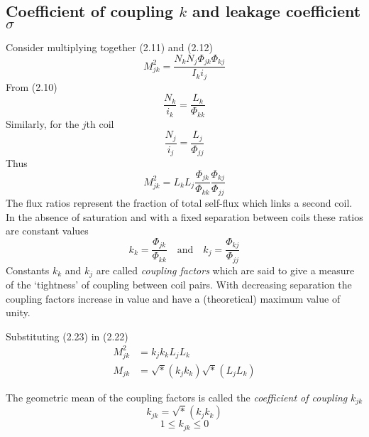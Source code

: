 \documentclass[a4paper,numbers=noenddot,12pt]{scrbook}
\begin{document}
        \subsection{Coefficient of coupling $k$ and leakage coefficient $\sigma$} Consider multiplying together (2.11) and (2.12)
        \begin{equation*}
            M_{jk}^2 = \dfrac{N_k N_j \Phi_{jk} \Phi_{kj}}{I_k i_j}
        \end{equation*}
        From (2.10)
        \begin{equation*}
            \dfrac{N_k}{i_k} = \dfrac{L_k}{\Phi_{kk}}
        \end{equation*}
        Similarly, for the $j$th coil
        \begin{equation*}
            \dfrac{N_j}{i_j} = \dfrac{L_j}{\Phi_{jj}}
        \end{equation*}
        Thus
        \begin{equation}
            M_{jk}^2 = L_k L_j \dfrac{\Phi_{jk}}{\Phi_{kk}} \dfrac{\Phi_{kj}}{\Phi_{jj}}
            \label{eq:Eq2.22}
        \end{equation}
        The flux ratios represent the fraction of total self-flux which links a second coil. In the absence of saturation and with a fixed separation between coils these ratios are constant values
        \begin{equation}
            k_k = \dfrac{\Phi_{jk}}{\Phi_{kk}} \quad \text{and} \quad k_j = \dfrac{\Phi_{kj}}{\Phi_{jj}}
            \label{eq:Eq2.23}
        \end{equation}
        Constants $k_k$ and $k_j$ are called \textit{coupling factors} which are said to give a measure of the `tightness' of coupling between coil pairs. With decreasing separation the coupling factors increase in value and have a (theoretical) maximum value of unity.

        Substituting (2.23) in (2.22)
        \begin{align*}
            M_{jk}^2 & = k_j k_k L_j L_k \\
            M_{jk} & = \sqrt*(k_j k_k) \sqrt*(L_j L_k)
        \end{align*}

        The geometric mean of the coupling factors is called the \textit{coefficient of coupling} $k_{jk}$
        \begin{equation}
            k_{jk} = \sqrt*(k_j k_k)
            \label{eq:Eq2.24}
        \end{equation}
        \begin{equation*}
            1 \leq k_{jk} \leq 0
        \end{equation*}
\end{document}
